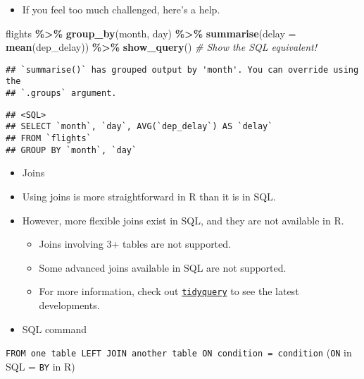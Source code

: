 \documentclass[
]{book}
\newenvironment{Shaded}{\begin{snugshade}}{\end{snugshade}}
\newcommand{\CommentTok}[1]{\textcolor[rgb]{0.56,0.35,0.01}{\textit{#1}}}
\newcommand{\DataTypeTok}[1]{\textcolor[rgb]{0.13,0.29,0.53}{#1}}
\newcommand{\KeywordTok}[1]{\textcolor[rgb]{0.13,0.29,0.53}{\textbf{#1}}}
\newcommand{\NormalTok}[1]{#1}
\newcommand{\OperatorTok}[1]{\textcolor[rgb]{0.81,0.36,0.00}{\textbf{#1}}}
\newcommand{\StringTok}[1]{\textcolor[rgb]{0.31,0.60,0.02}{#1}}
\providecommand{\tightlist}{%
  \setlength{\itemsep}{0pt}\setlength{\parskip}{0pt}}
\begin{document}
\begin{itemize}
\tightlist
\item
  If you feel too much challenged, here's a help.
\end{itemize}

\begin{Shaded}
\begin{Highlighting}[]
\NormalTok{flights }\OperatorTok{\%\textgreater{}\%}
\StringTok{  }\KeywordTok{group\_by}\NormalTok{(month, day) }\OperatorTok{\%\textgreater{}\%}
\StringTok{  }\KeywordTok{summarise}\NormalTok{(}\DataTypeTok{delay =} \KeywordTok{mean}\NormalTok{(dep\_delay)) }\OperatorTok{\%\textgreater{}\%}
\StringTok{  }\KeywordTok{show\_query}\NormalTok{() }\CommentTok{\# Show the SQL equivalent!}
\end{Highlighting}
\end{Shaded}

\begin{verbatim}
## `summarise()` has grouped output by 'month'. You can override using the
## `.groups` argument.
\end{verbatim}

\begin{verbatim}
## <SQL>
## SELECT `month`, `day`, AVG(`dep_delay`) AS `delay`
## FROM `flights`
## GROUP BY `month`, `day`
\end{verbatim}

\begin{itemize}
\item
  Joins
\item
  Using joins is more straightforward in R than it is in SQL.
\item
  However, more flexible joins exist in SQL, and they are not available in R.

  \begin{itemize}
  \tightlist
  \item
    Joins involving 3+ tables are not supported.
  \item
    Some advanced joins available in SQL are not supported.
  \item
    For more information, check out \href{https://github.com/ianmcook/tidyquery/issues}{\texttt{tidyquery}} to see the latest developments.
  \end{itemize}
\item
  SQL command
\end{itemize}

\texttt{FROM\ one\ table\ LEFT\ JOIN\ another\ table\ ON\ condition\ =\ condition} (\texttt{ON} in SQL = \texttt{BY} in R)
\end{document}
